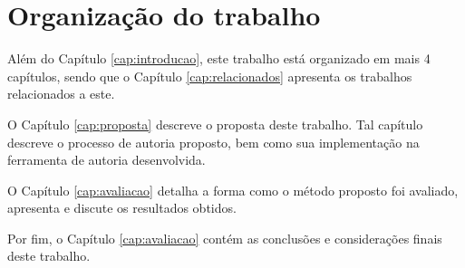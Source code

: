\documentclass[../main.tex]{subfiles}
\begin{document}
\section{Organização do trabalho}

Além do Capítulo \ref{cap:introducao}, este trabalho está organizado em mais 4 capítulos, sendo que o Capítulo \ref{cap:relacionados} apresenta os trabalhos relacionados a este.


O Capítulo \ref{cap:proposta} descreve o proposta deste trabalho. Tal capítulo descreve o processo de autoria proposto, bem como sua implementação na ferramenta de autoria desenvolvida.

O Capítulo \ref{cap:avaliacao} detalha a forma como o método proposto foi avaliado, apresenta e discute os resultados obtidos.

Por fim, o Capítulo \ref{cap:avaliacao} contém as conclusões e considerações finais deste trabalho.
\end{document}
